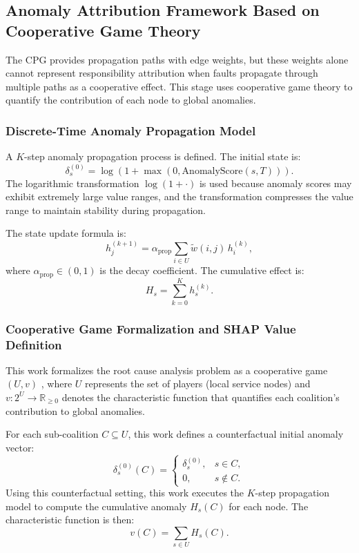\documentclass[conference]{IEEEtran}
\begin{document}
\subsection{Anomaly Attribution Framework Based on Cooperative Game Theory}

The CPG provides propagation paths with edge weights, but these weights alone cannot represent responsibility attribution when faults propagate through multiple paths as a cooperative effect. This stage uses cooperative game theory to quantify the contribution of each node to global anomalies.

\subsubsection{Discrete-Time Anomaly Propagation Model}

A $K$-step anomaly propagation process is defined. The initial state is:
\begin{equation}
\delta_s^{(0)} = \log(1 + \max(0, \text{AnomalyScore}(s,T))).
\end{equation}
The logarithmic transformation $\log(1 + \cdot)$ is used because anomaly scores may exhibit extremely large value ranges, and the transformation compresses the value range to maintain stability during propagation.

The state update formula is:
\begin{equation}
h_j^{(k+1)} = \alpha_{\text{prop}} \sum_{i \in U} \tilde{w}(i,j) \, h_i^{(k)},
\end{equation}
where $\alpha_{\text{prop}} \in (0,1)$ is the decay coefficient. The cumulative effect is:
\begin{equation}
H_s = \sum_{k=0}^{K} h_s^{(k)}.
\end{equation}

\subsubsection{Cooperative Game Formalization and SHAP Value Definition}

This work formalizes the root cause analysis problem as a cooperative game $(U, v)$ \cite{lundberg2017,heskes2020,janzing2020}, where $U$ represents the set of players (local service nodes) and $v: 2^U \to \mathbb{R}_{\geq 0}$ denotes the characteristic function that quantifies each coalition's contribution to global anomalies.

For each sub-coalition $C \subseteq U$, this work defines a counterfactual initial anomaly vector:
\begin{equation}
\delta_s^{(0)}(C) = 
\begin{cases}
 \delta_s^{(0)}, & s \in C, \\
 0, & s \notin C.
\end{cases}
\end{equation}
Using this counterfactual setting, this work executes the $K$-step propagation model to compute the cumulative anomaly $H_s(C)$ for each node. The characteristic function is then:
\begin{equation}
v(C) = \sum_{s \in U} H_s(C).
\end{equation}
\end{document}
